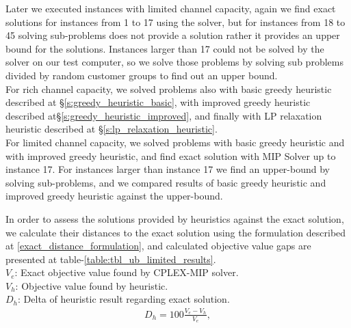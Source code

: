 \documentclass[11pt]{article}
\begin{document}
Later we executed instances with limited channel capacity, again we find exact solutions for instances from 1 to 17 using the solver, but for instances from 18 to 45 solving sub-problems does not provide a solution rather it provides an upper bound for the solutions. Instances larger than 17 could not be solved by the solver on our test computer, so we solve those problems by solving sub problems divided by random customer groups to find out an upper bound.\\

For rich channel capacity, we solved problems also with basic greedy heuristic described at \S \ref{s:greedy_heuristic_basic}, with improved greedy heuristic described at\S \ref{s:greedy_heuristic_improved}, and finally with LP relaxation heuristic described at \S \ref{s:lp_relaxation_heuristic}.\\

For limited channel capacity, we solved problems with basic greedy heuristic and with improved greedy heuristic, and find exact solution with MIP Solver up to instance 17. For instances larger than instance 17 we find an upper-bound by solving sub-problems, and we compared results of basic greedy heuristic and improved greedy heuristic against the upper-bound. 

In order to assess the solutions provided by heuristics against the exact solution, we calculate their distances to the exact solution using the formulation described at \equationautorefname \eqref{exact_distance_formulation}, and calculated objective value gaps are presented at table-\ref{table:tbl_ub_limited_results}.\\

\noindent $V_{e}$: Exact objective value found by CPLEX-MIP solver. \\
\noindent $V_{h}$: Objective value found by heuristic. \\
\noindent $D_{h}$: Delta of heuristic result regarding exact solution. \\
\begin{align}
&D_{h} = 100 \frac{V_{e} - V_{h}}{V_{e}}, \label{exact_distance_formulation}&
\end{align}\\
\end{document}
